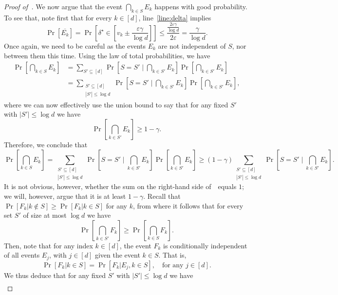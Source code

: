 \begin{proof}[Proof of~]
We now argue that the event $\bigcap_{k \in S} E_k$ happens with good probability.
To see that, note first that for every $k \in [d]$, line~\ref{line:delta} implies
\[
	\Pr[\overline{E_k}] = \Pr\left[\delta^\star \in \left[v_k \pm \frac{\varepsilon \gamma}{\log d}\right]\right] \leq \frac{\frac{2\varepsilon \gamma}{\log d}}{2\varepsilon} = \frac{\gamma}{\log d}.
\]
Once again, we need to be careful as the events $E_k$ are not independent of $S$, nor between them this time.
Using the law of total probabilities, we have 
\begin{align*}
	\Pr\left[\bigcap_{k \in S} E_k\right] &= \sum_{S' \subseteq [d]} \Pr\left[S = S'  \mid \bigcap_{k \in S'} E_k \right] \Pr\left[\bigcap_{k \in S'} E_k\right]\\
	&= \sum_{\substack{S' \subseteq [d]\\ |S'| \leq \log d}} \Pr\left[S = S' \mid \bigcap_{k \in S'} E_k\right] \Pr\left[\bigcap_{k \in S'} E_k\right],
\end{align*}
where we can now effectively use the union bound to say that for any fixed $S'$ with $|S'| \leq \log d$ we have
\[ 
	\Pr\left[\bigcap_{k \in S'} E_k \right] \geq 1 - \gamma.
\]
Therefore, we conclude that
\begin{equation}
	\Pr\left[\bigcap_{k \in S} E_k\right] =  \sum_{\substack{S' \subseteq [d]\\ |S'| \leq \log d}} \Pr\left[S = S'\mid \bigcap_{k \in S'} E_k\right] \Pr\left[\bigcap_{k \in S'} E_k\right] \geq (1-\gamma) \sum_{\substack{S' \subseteq [d]\\ |S'| \leq \log d}} \Pr\left[S = S' \mid \bigcap_{k \in S'} E_k\right]. \label{eq:align}
\end{equation}
It is not obvious, however, whether the sum on the right-hand side of~~equals $1$; we will, however, argue that it is at least $1-\gamma$. 
Recall that $\Pr[F_k | k \not\in S] \geq \Pr[F_k | k \in S]$ for any $k$, from where it follows that for every set $S'$ of size at most $\log d$ we have 
\[ 
	\Pr\left[\bigcap_{k \in S'} F_k \right] \geq \Pr\left[\bigcap_{k \in S} F_k \right].	
\]
Then, note that for any index $k \in [d]$, the event $F_k$ is conditionally independent of all events $E_{j}$, with $j \in [d]$ given the event $k \in S$. That is,
\[
	\Pr\left[F_k | k \in S\right] = \Pr\left[F_k | E_{j}, k \in S\right], \quad \text{for any } j \in [d].
\]
We thus deduce that for any fixed $S'$ with $|S'| \leq \log d$ we have
\begin{align}\label{eq:2}

\end{align}
\end{proof}
